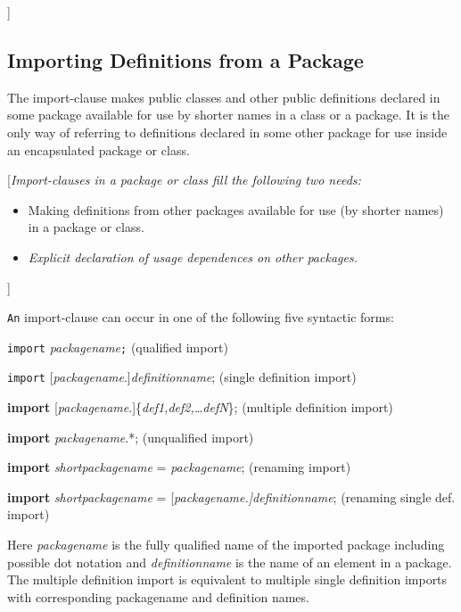 {]}

\subsection{Importing Definitions from a Package}

The import-clause makes public classes and other public definitions
declared in some package available for use by shorter names in a class
or a package. It is the only way of referring to definitions declared in
some other package for use inside an encapsulated package or class.

{[}\emph{Import-clauses in a package or class fill the following two
needs:}

\begin{itemize}
\item
  Making definitions from other packages available for use (by shorter
  names) in a package or class.
\item
  \emph{Explicit declaration of usage dependences on other packages.}
\end{itemize}

{]}

\lstinline[basicstyle=\ttfamily]!An! import-clause can occur in one of the following five syntactic forms:

\lstinline[basicstyle=\ttfamily]!import! \emph{packagename}\lstinline[basicstyle=\ttfamily]!;! (qualified import)

\lstinline[basicstyle=\ttfamily]!import! {[}\emph{packagename}.{]}\emph{definitionname}; (single
definition import)

\textbf{import}
{[}\emph{packagename}.{]}\{\emph{def1,def2,\ldots{}defN}\}; (multiple
definition import)

\textbf{import} \emph{packagename}.*; (unqualified import)

\textbf{import} \emph{shortpackagename} = \emph{packagename}; (renaming
import)

\textbf{import} \emph{shortpackagename} =
{[}\emph{packagename.{]}definitionname}; (renaming single def. import)

Here \emph{packagename} is the fully qualified name of the imported
package including possible dot notation and \emph{definitionname} is the
name of an element in a package. The multiple definition import is
equivalent to multiple single definition imports with corresponding
packagename and definition names.

